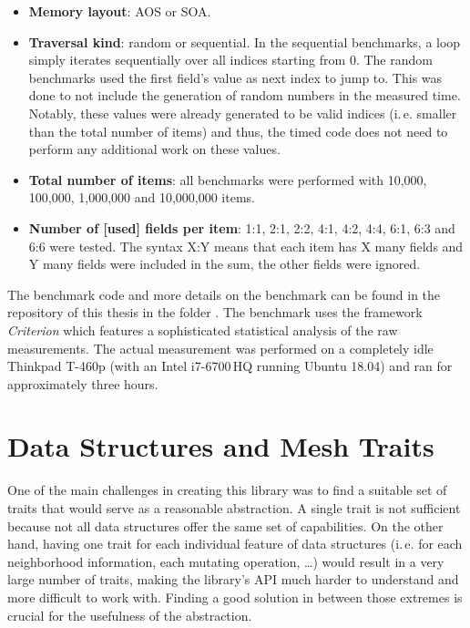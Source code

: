 \begin{itemize}
  \item \textbf{Memory layout}: AOS or SOA.
  \item \textbf{Traversal kind}: random or sequential.
  In the sequential benchmarks, a loop simply iterates sequentially over all indices starting from 0.
  The random benchmarks used the first field's  value as next index to jump to.
  This was done to not include the generation of random numbers in the measured time.
  Notably, these  values were already generated to be valid indices (i.\,e. smaller than the total number of items) and thus, the timed code does not need to perform any additional work on these values.
  \item \textbf{Total number of items}: all benchmarks were performed with 10,000, 100,000, 1,000,000 and 10,000,000 items.
  \item \textbf{Number of [used] fields per item}: 1:1, 2:1, 2:2, 4:1, 4:2, 4:4, 6:1, 6:3 and 6:6 were tested.
  The syntax X:Y means that each item has X many fields and Y many fields were included in the sum, the other fields were ignored.
\end{itemize}

The benchmark code and more details on the benchmark can be found in the repository of this thesis in the folder .
The benchmark uses the framework \emph{Criterion} \cite{criterion} which features a sophisticated statistical analysis of the raw measurements.
The actual measurement was performed on a completely idle \textsf{Thinkpad T-460p} (with an \textsf{Intel i7-6700\,HQ} running \textsf{Ubuntu 18.04}) and ran for approximately three hours.


\newpage
\section{Data Structures and Mesh Traits}

One of the main challenges in creating this library was to find a suitable set of traits that would serve as a reasonable abstraction.
A single trait is not sufficient because not all data structures offer the same set of capabilities.
On the other hand, having one trait for each individual feature of data structures (i.\,e. for each neighborhood information, each mutating operation, \dots) would result in a very large number of traits, making the library's API much harder to understand and more difficult to work with.
Finding a good solution in between those extremes is crucial for the usefulness of the abstraction.

